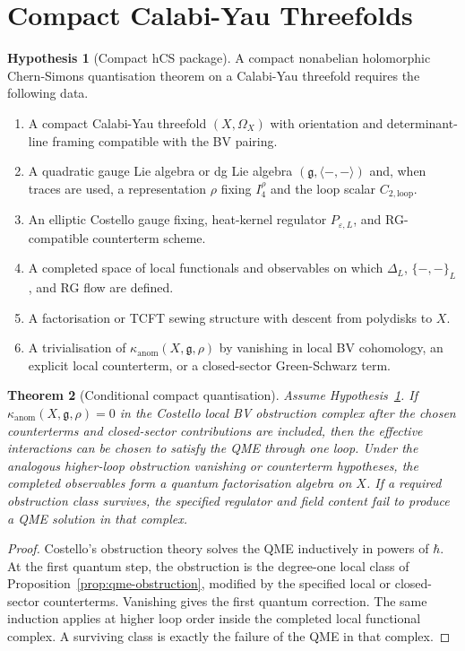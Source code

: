 \documentclass[11pt]{article}
\newtheorem{theorem}{Theorem}[section]
\theoremstyle{definition}
\newtheorem{hypothesis}[theorem]{Hypothesis}
\theoremstyle{remark}
\providecommand{\fg}{\mathfrak{g}}
\providecommand{\Ctwo}{C_{2,\mathrm{loop}}}
\providecommand{\kanom}{\kappa_{\operatorname{anom}}}
\begin{document}
\section{Compact Calabi-Yau Threefolds}
\label{sec:compact-cy3}

\begin{hypothesis}[Compact hCS package]
\label{hyp:compact-package}
A compact nonabelian holomorphic Chern-Simons quantisation theorem on a
Calabi-Yau threefold requires the following data.
\begin{enumerate}[label=\textup{(\roman*)}]
\item A compact Calabi-Yau threefold $(X,\Omega_X)$ with orientation and
determinant-line framing compatible with the BV pairing.
\item A quadratic gauge Lie algebra or dg Lie algebra
$(\fg,\langle-,-\rangle)$ and, when traces are used, a representation
$\rho$ fixing $I_4^\rho$ and the loop scalar $\Ctwo$.
\item An elliptic Costello gauge fixing, heat-kernel regulator
$P_{\varepsilon,L}$, and RG-compatible counterterm scheme.
\item A completed space of local functionals and observables on which
$\Delta_L$, $\{-,-\}_L$, and RG flow are defined.
\item A factorisation or TCFT sewing structure with descent from
polydisks to $X$.
\item A trivialisation of $\kanom(X,\fg,\rho)$ by vanishing in local BV
cohomology, an explicit local counterterm, or a closed-sector
Green-Schwarz term.
\end{enumerate}
\end{hypothesis}

\begin{theorem}[Conditional compact quantisation]
\label{thm:conditional-compact-quantisation}
Assume Hypothesis~\ref{hyp:compact-package}.  If
$\kanom(X,\fg,\rho)=0$ in the Costello local BV obstruction complex
after the chosen counterterms and closed-sector contributions are
included, then the effective interactions can be chosen to satisfy the
QME through one loop.  Under the analogous higher-loop obstruction
vanishing or counterterm hypotheses, the completed observables form a
quantum factorisation algebra on $X$.  If a required obstruction class
survives, the specified regulator and field content fail to produce a
QME solution in that complex.
\end{theorem}

\begin{proof}
Costello's obstruction theory solves the QME inductively in powers of
$\hbar$.  At the first quantum step, the obstruction is the degree-one
local class of Proposition~\ref{prop:qme-obstruction}, modified by the
specified local or closed-sector counterterms.  Vanishing gives the
first quantum correction.  The same induction applies at higher loop
order inside the completed local functional complex.  A surviving class
is exactly the failure of the QME in that complex.
\end{proof}
\end{document}
